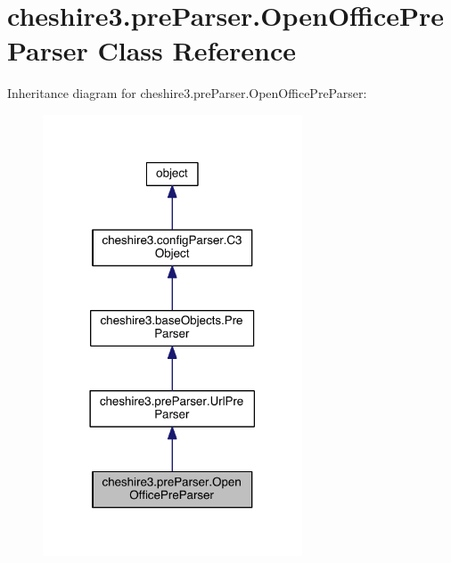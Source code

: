 \hypertarget{classcheshire3_1_1pre_parser_1_1_open_office_pre_parser}{\section{cheshire3.\-pre\-Parser.\-Open\-Office\-Pre\-Parser Class Reference}
\label{classcheshire3_1_1pre_parser_1_1_open_office_pre_parser}
}


Inheritance diagram for cheshire3.\-pre\-Parser.\-Open\-Office\-Pre\-Parser\-:
\nopagebreak
\begin{figure}[H]
\begin{center}
\leavevmode
\includegraphics[width=218pt]{classcheshire3_1_1pre_parser_1_1_open_office_pre_parser__inherit__graph}
\end{center}
\end{figure}


